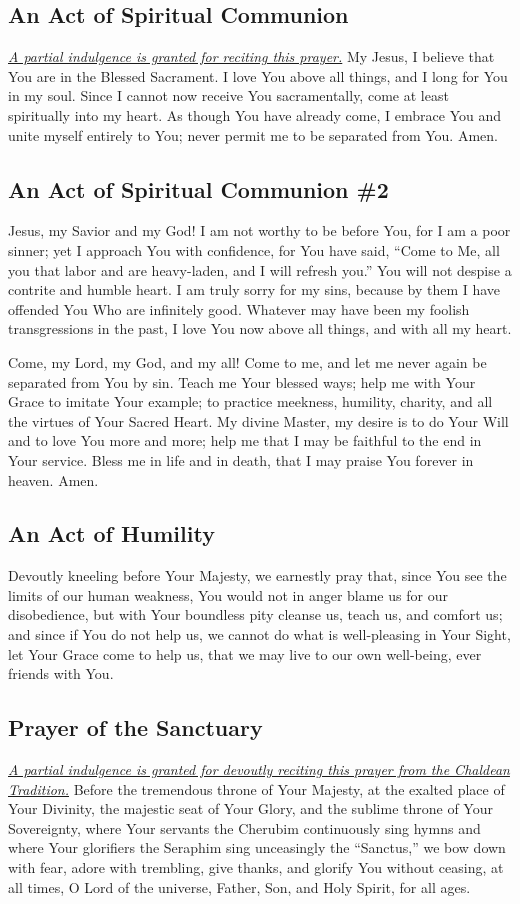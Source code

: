 \documentclass[12pt]{article}
\newcommand{\prayertitle}[1]{\subsection{#1}}
\newcommand{\indulgencedprayertitle}[1]{\prayertitle{#1 \protect\kreuz}}
\newcommand{\emphasis}[1]{\emph{#1}}
\newcommand{\emphasis}[1]{\textsl{#1}}
\newcommand{\note}[1]{{\small{\emphasis{#1}}}\newline}
\newcommand{\linkednote}[2]{\hyperlink{#1}{\note{#2}}}
\begin{document}
\indulgencedprayertitle{An Act of Spiritual Communion}
\linkednote{grant8}{A partial indulgence is granted for reciting this prayer.}
My Jesus, I believe that You are in the Blessed Sacrament.
I love You above all things, and I long for You in my soul.
Since I cannot now receive You sacramentally, come at least spiritually into my heart.
As though You have already come, I embrace You and unite myself entirely to You;
never permit me to be separated from You.
Amen.

\prayertitle{An Act of Spiritual Communion \#2}
Jesus, my Savior and my God!
I am not worthy to be before You, for I am a poor sinner;
yet I approach You with confidence, for You have said, ``Come to Me, all you that labor and are heavy-laden, and I will refresh you.''
You will not despise a contrite and humble heart.
I am truly sorry for my sins, because by them I have offended You Who are infinitely good.
Whatever may have been my foolish transgressions in the past, I love You now above all things, and with all my heart.

Come, my Lord, my God, and my all!
Come to me, and let me never again be separated from You by sin.
Teach me Your blessed ways;
help me with Your Grace to imitate Your example;
to practice meekness, humility, charity, and all the virtues of Your Sacred Heart.
My divine Master, my desire is to do Your Will and to love You more and more;
help me that I may be faithful to the end in Your service.
Bless me in life and in death, that I may praise You forever in heaven.
Amen.

\prayertitle{An Act of Humility}
Devoutly kneeling before Your Majesty,
we earnestly pray that, since You see the limits of our human weakness, You would not in anger blame us for our disobedience, but with Your boundless pity cleanse us, teach us, and comfort us;
and since if You do not help us, we cannot do what is well-pleasing in Your Sight, let Your Grace come to help us, that we may live to our own well-being, ever friends with You.

\indulgencedprayertitle{Prayer of the Sanctuary}
\linkednote{grant23}{A partial indulgence is granted for devoutly reciting this prayer from the Chaldean Tradition.}
Before the tremendous throne of Your Majesty, at the exalted place of Your Divinity, the majestic seat of Your Glory, and the sublime throne of Your Sovereignty, where Your servants the Cherubim continuously sing hymns and where Your glorifiers the Seraphim sing unceasingly the ``Sanctus,'' we bow down with fear, adore with trembling, give thanks, and glorify You without ceasing, at all times, O Lord of the universe, Father, Son, and Holy Spirit, for all ages.
\end{document}
